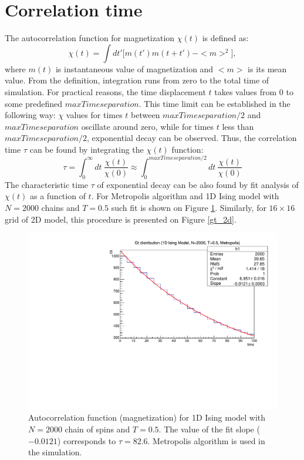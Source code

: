 \documentclass[11pt,a4paper]{article}%
\begin{document}
\section{Correlation time}
The autocorrelation function for magnetization $\chi(t)$ is defined as:
\begin{equation}
\chi(t) = \int{dt'[m(t')m(t+t')-<m>^2}],
\end{equation}
where $m(t)$ is instantaneous value of magnetization and $<m>$ is its mean value.
From the definition, integration runs from zero to the total time of simulation. 
For practical reasons, the time displacement $t$ takes values from 0 to some predefined $maxTimeseparation$. This time limit can be established in the following way:
$\chi$ values for times $t$ between $maxTimeseparation/2$ and $maxTimeseparation$ oscillate around zero, while for times $t$ less than $maxTimeseparation/2$, exponential decay can be observed. 
Thus, the correlation time $\tau$ can be found by integrating the $\chi(t)$ function:
\begin{equation}
\tau = \int_0^{\infty}{dt~ \dfrac{\chi(t)}{\chi(0)}} \approx \int_0^{maxTimeseparation/2}{dt~ \dfrac{\chi(t)}{\chi(0)}}
\end{equation}
The characteristic time $\tau$ of exponential decay can be also found by fit analysis of 
 $\chi(t)$ as a function of $t$. For Metropolis algorithm and 1D Ising model with $N=2000$ chains and $T=0.5$ such fit is shown on Figure \ref{gt_1d_t05}. Similarly, for $16\times16$ grid of 2D model, this procedure is presented on Figure \ref{gt_2d}.
     

\begin{figure}[!ht]
\centering
  \includegraphics[scale=0.6]{IsingTestTCorr_Gt_1D_T05.pdf}
  \vspace{-0.05in}
   \caption[]{Autocorrelation function (magnetization) for 1D Ising model with $N=2000$ chain of spins and $T=0.5$. The value of the fit slope ($-0.0121$) corresponds to $\tau=82.6$. Metropolis algorithm is used in the simulation.}   
  \label{gt_1d_t05}
\end{figure}
\end{document}
